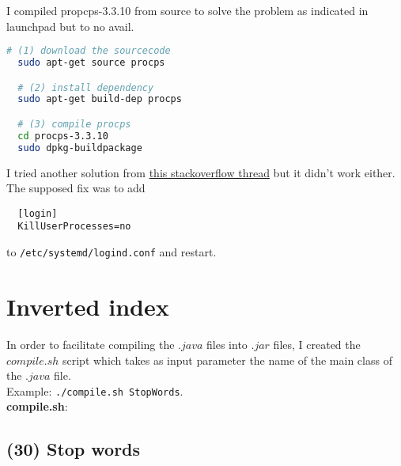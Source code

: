 \documentclass[a4paper,12pt]{article}
\begin{document}
I compiled propcps-3.3.10 from source to solve the problem as indicated in launchpad but to no avail.
\begin{lstlisting}[language=bash]
  # (1) download the sourcecode
  sudo apt-get source procps

  # (2) install dependency
  sudo apt-get build-dep procps

  # (3) compile procps
  cd procps-3.3.10
  sudo dpkg-buildpackage
\end{lstlisting}


I tried another solution from \href{http://stackoverflow.com/questions/38419078/logouts-while-running-hadoop-under-ubuntu-16-04}{this stackoverflow thread} but it didn't work either.
The supposed fix was to add
\begin{lstlisting}
  [login]
  KillUserProcesses=no
\end{lstlisting}
to \lstinline{/etc/systemd/logind.conf} and restart.


\section{Inverted index}

In order to facilitate compiling the $.java$ files into $.jar$ files, I created
the $compile.sh$ script which takes as input parameter the name of the main class of the $.java$ file.
\\Example: \lstinline{./compile.sh StopWords}.
\\ \textbf{compile.sh}:


\subsection{(30) Stop words}
\end{document}
